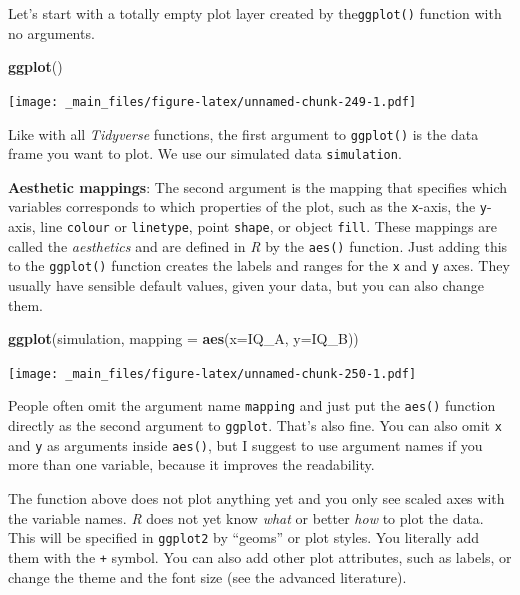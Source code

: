 \documentclass[
]{scrartcl}
\newenvironment{Shaded}{\begin{snugshade}}{\end{snugshade}}
\newcommand{\AttributeTok}[1]{\textcolor[rgb]{0.13,0.29,0.53}{#1}}
\newcommand{\FunctionTok}[1]{\textcolor[rgb]{0.13,0.29,0.53}{\textbf{#1}}}
\newcommand{\NormalTok}[1]{#1}
\begin{document}
Let's start with a totally empty plot layer created by the\texttt{ggplot()} function with no arguments.

\begin{Shaded}
\begin{Highlighting}[]
\FunctionTok{ggplot}\NormalTok{()}
\end{Highlighting}
\end{Shaded}

\texttt{[image: \_main\_files/figure-latex/unnamed-chunk-249-1.pdf]}

Like with all \emph{Tidyverse} functions, the first argument to \texttt{ggplot()} is the data frame you want to plot. We use our simulated data \texttt{simulation}.

\textbf{Aesthetic mappings}: The second argument is the mapping that specifies which variables corresponds to which properties of the plot, such as the \texttt{x}-axis, the \texttt{y}-axis, line \texttt{colour} or \texttt{linetype}, point \texttt{shape}, or object \texttt{fill}. These mappings are called the \emph{aesthetics} and are defined in \emph{R} by the \texttt{aes()} function. Just adding this to the \texttt{ggplot()} function creates the labels and ranges for the \texttt{x} and \texttt{y} axes. They usually have sensible default values, given your data, but you can also change them.

\begin{Shaded}
\begin{Highlighting}[]
\FunctionTok{ggplot}\NormalTok{(simulation, }\AttributeTok{mapping =} \FunctionTok{aes}\NormalTok{(}\AttributeTok{x=}\NormalTok{IQ\_A, }\AttributeTok{y=}\NormalTok{IQ\_B))}
\end{Highlighting}
\end{Shaded}

\texttt{[image: \_main\_files/figure-latex/unnamed-chunk-250-1.pdf]}

People often omit the argument name \texttt{mapping} and just put the \texttt{aes()} function directly as the second argument to \texttt{ggplot}. That's also fine. You can also omit \texttt{x} and \texttt{y} as arguments inside \texttt{aes()}, but I suggest to use argument names if you more than one variable, because it improves the readability.

The function above does not plot anything yet and you only see scaled axes with the variable names. \emph{R} does not yet know \emph{what} or better \emph{how} to plot the data. This will be specified in \texttt{ggplot2} by ``geoms'' or plot styles. You literally add them with the \texttt{+} symbol. You can also add other plot attributes, such as labels, or change the theme and the font size (see the advanced literature).
\end{document}
